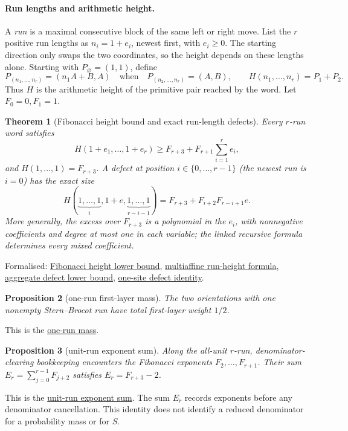 \documentclass[11pt]{article}
\newcommand{\commit}{99f4bf47422abbd8757cbb22b50ba079d764d3a7}
\newcommand{\repobase}{https://github.com/wcook04/plectis-erdos/blob/\commit}
\newcommand{\PK}{Erdos249257}
\newcommand{\lword}[4]{\href{\repobase/\PK/#1\#L#2}{#4}}
\newtheorem{theorem}{Theorem}[section]
\newtheorem{proposition}[theorem]{Proposition}
\theoremstyle{definition}
\theoremstyle{remark}
\begin{document}
{\paragraph{Run lengths and arithmetic height.}
A \emph{run} is a maximal consecutive block of the same left or right move.
List the $r$ positive run lengths as $n_i=1+e_i$, newest first, with $e_i\ge0$.
The starting direction only swaps the two coordinates, so the height depends
on these lengths alone.  Starting with \(P_\varnothing=(1,1)\), define
\[
  P_{(n_1,\ldots,n_r)}=(n_1A+B,A)
  \quad\text{when}\quad P_{(n_2,\ldots,n_r)}=(A,B),
  \qquad H(n_1,\ldots,n_r)=P_1+P_2.
\]
Thus \(H\) is the arithmetic height of the primitive pair reached by the
word.  Let \(F_0=0,F_1=1\).

\begin{theorem}[Fibonacci height bound and exact run-length defects]
\label{res:sternbrocotruns}
Every \(r\)-run word satisfies
\[
 H(1+e_1,\ldots,1+e_r)
 \ge F_{r+3}+F_{r+1}\sum_{i=1}^r e_i,
\]
and \(H(1,\ldots,1)=F_{r+3}\).  A defect at position
\(i\in\{0,\ldots,r-1\}\) (the newest run is $i=0$) has the exact size
\[
 H(\underbrace{1,\ldots,1}_{i},1+e,
   \underbrace{1,\ldots,1}_{r-i-1})
 =F_{r+3}+F_{i+2}F_{r-i+1}e.
\]
More generally, the excess over $F_{r+3}$ is a polynomial in the $e_i$, with
nonnegative coefficients and degree at most one in each variable; the linked
recursive formula determines every mixed coefficient.
\end{theorem}
\noindent Formalised:
\lword{SternBrocotRunGeometry.lean}{185}{runHeight_fib_lower}{Fibonacci height lower bound},
\lword{SternBrocotRunGeometry.lean}{263}{runHeight_defectRunLengths}{multiaffine run-height formula},
\lword{SternBrocotRunGeometry.lean}{343}{runHeight_defect_fib_sum_lower}{aggregate defect lower bound},
\lword{SternBrocotRunGeometry.lean}{413}{runHeight_oneSiteDefect}{one-site defect identity}.

\begin{proposition}[one-run first-layer mass]\label{res:onerunmass}
The two orientations with one nonempty Stern--Brocot run have total
first-layer weight $1/2$.
\end{proposition}
\noindent This is the
\lword{SternBrocotRunGeometry.lean}{467}{oneRunMass_eq_half}{one-run mass}.

\begin{proposition}[unit-run exponent sum]\label{res:rundenominator}
Along the all-unit $r$-run, denominator-clearing bookkeeping encounters the
Fibonacci exponents $F_2,\ldots,F_{r+1}$.  Their sum
$E_r=\sum_{j=0}^{r-1}F_{j+2}$ satisfies \(E_r=F_{r+3}-2\).
\end{proposition}
\noindent This is the
\lword{SternBrocotRunGeometry.lean}{491}{naturalRunDenominatorExponent_add_two}{unit-run exponent sum}.
The sum $E_r$ records exponents before any denominator cancellation.  This
identity does not identify a reduced denominator for a probability mass or
for \(S\).

}
\end{document}
